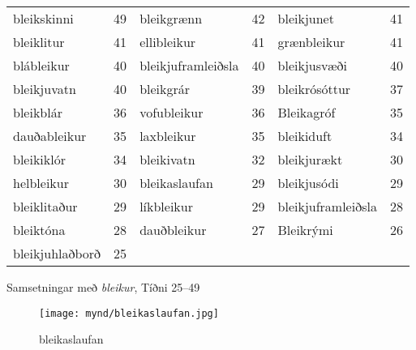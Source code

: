 \documentclass[../samsetningasafn.tex]{subfiles}
\begin{document}
\begin{wordlist}[H]
\begin{tcolorbox}

	\setlength{\extrarowheight}{3pt}
	\begin{tabular}{BlBlBl}	
		bleikskinni		& 49		& 	
		bleikgrænn		& 42		& 	
		bleikjunet		& 41		\\ 	
		bleiklitur			& 41		& 
		ellibleikur		& 41		& 	
		grænbleikur		& 41		\\ 
		blábleikur		& 40		& 
		bleikjuframleiðsla	& 40		& 
		bleikjusvæði		& 40		\\ 	
		bleikjuvatn		& 40		& 	
		bleikgrár			& 39		& 	
		bleikrósóttur		& 37		\\ 
		bleikblár			& 36		& 
		vofubleikur		& 36		& 	
		Bleikagróf		& 35		\\ 		
		dauðableikur		& 35		& 
		laxbleikur		& 35		& 		
		bleikiduft		& 34		\\ 	
		bleikiklór		& 34		& 
		bleikivatn		& 32		& 	
		bleikjurækt		& 30		\\ 	
		helbleikur		& 30		& 	
		bleikaslaufan		& 29		& 
		bleikjusódi		& 29		\\ 	
		bleiklitaður		& 29		& 
		líkbleikur		& 29		& 	
		bleikjuframleiðsla & 28		\\ 
		bleiktóna		& 28		& 
		dauðbleikur		& 27		& 	
		Bleikrými		& 26		\\ 
		bleikjuhlaðborð	& 25		& 	
						&			&
						&
	\end{tabular}

\end{tcolorbox}
	\caption{Samsetningar með \textit{bleikur}, Tíðni 25--49}
	\label{listi:bleikt.25}
\end{wordlist}

\begin{figure}[H]
\begin{tcolorbox}
\centering
	\texttt{[image: mynd/bleikaslaufan.jpg]}
\end{tcolorbox}
	\caption{bleikaslaufan}
	\label{mynd:bleikaslaufan}
\end{figure}	
\end{document}
